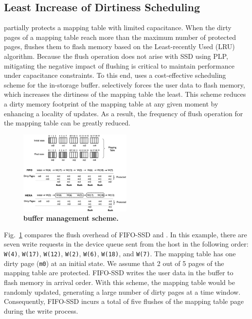 \subsection{Least Increase of Dirtiness Scheduling}
\label{subsec:lind_sched}
\fi
\ours{} partially protects a mapping table with limited capacitance.  When the
dirty pages of a mapping table reach more than the maximum number of protected
pages, \ours{} flushes them to flash memory based on the Least-recently Used
(LRU) algorithm.  Because the flush operation does not arise with SSD using
PLP, mitigating the negative impact of  flushing is critical to maintain
performance under capacitance constraints.  To this end, \ours{} uses a
cost-effective scheduling scheme for the in-storage buffer. \ours{}
selectively forces the user data to flash memory, which increases the dirtiness
of the mapping table the least. This scheme reduces a dirty memory footprint of
the mapping table at any given moment by enhancing a locality of
updates.  As a result, the frequency of flush operation for the mapping table
can be greatly reduced. 

\begin{figure}
    \centering{}
    \includegraphics[width=0.5\textwidth]{figure/dawid_algo.eps}
    \caption{\textbf{\ours{} buffer management scheme.}}
    \label{fig:dawid_buff_overview}
\end{figure}

Fig.~\ref{fig:dawid_buff_overview} compares the flush overhead of FIFO-SSD and \ours{}. 
In this example, there are seven write requests 
in the device queue sent from the host in the following order: \texttt{W(4)}, \texttt{W(17)}, \texttt{W(12)}, \texttt{W(2)}, \texttt{W(6)}, \texttt{W(18)}, and \texttt{W(7)}.  
The mapping table has one dirty page (\texttt{m0}) 
at an initial state. We assume that 2 out of 5 pages of the mapping table are protected. 
FIFO-SSD writes the user data in the buffer to flash memory in arrival order. 
With this scheme, the mapping table would be randomly updated, generating a large number of dirty pages at a 
time window. 
Consequently, FIFO-SSD incurs a total of five flushes of the mapping table page during the write process. 


